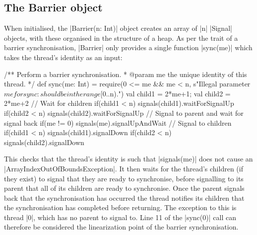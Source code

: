 
\subsection{The Barrier object}
\inlineScala
When initialised, the |Barrier(n: Int)| object creates an array of |n| |Signal| objects, with these organised in the structure of a heap. As per the trait of a barrier synchronisation, |Barrier| only provides a single function |sync(me)| which takes the thread's identity as an input:

\begin{scala}[caption={The Scala definition of the {\scalastyle Barrier.sync} function from \cite{LoweBarrier}}]
/** Perform a barrier synchronisation.
  * @param me the unique identity of this thread. */
def sync(me: Int) = {
  require(0 <= me && me < n, 
    s"Illegal parameter $me for sync: should be in the range [0..$n).")
  val child1 = 2*me+1; val child2 = 2*me+2
  // Wait for children
  if(child1 < n) signals(child1).waitForSignalUp
  if(child2 < n) signals(child2).waitForSignalUp
  // Signal to parent and wait for signal back
  if(me != 0) signals(me).signalUpAndWait
  // Signal to children
  if(child1 < n) signals(child1).signalDown
  if(child2 < n) signals(child2).signalDown
}  
\end{scala}

This checks that the thread's identity is such that |signals(me)| does not cause an 
|ArrayIndexOutOfBoundsException|. It then waits for the thread's children (if they exist) to signal that they are ready to synchronise, before signalling to its parent that all of its children are ready to synchronise. Once the parent signals back that the synchronisation has occurred the thread notifies its children that the synchronisation has completed before returning. The exception to this is thread |0|, which has no parent to signal to. Line 11 of the |sync(0)| call can therefore be considered the linearization point of the barrier synchronisation.

